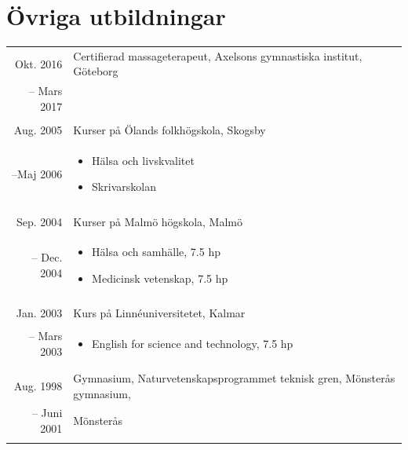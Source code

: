\documentclass[11pt,a4paper]{article}
\begin{document}
\section{Övriga utbildningar}
\begin{tabularx}{\textwidth}{r|X}
	
	Okt. 2016& Certifierad massageterapeut, Axelsons gymnastiska institut, Göteborg\\
	-- Mars 2017& \\
	\multicolumn{2}{c}{} \\
	
	Aug. 2005& Kurser på Ölands folkhögskola, Skogsby \\
	--Maj 2006&\footnotesize{\vspace{-5pt}
		\begin{itemize}[leftmargin=10pt, topsep=-12.5pt]
			\item Hälsa och livskvalitet
			\item Skrivarskolan
		\end{itemize}\vspace{-30pt} 
	}\\
	\multicolumn{2}{c}{} \\
	
	Sep. 2004& Kurser på Malmö högskola, Malmö\\
	-- Dec. 2004&\footnotesize{\vspace{-5pt}
		\begin{itemize}[leftmargin=10pt, topsep=-12.5pt]
			\item Hälsa och samhälle, 7.5 hp
			\item Medicinsk vetenskap, 7.5 hp
		\end{itemize}\vspace{-30pt} 
	}\\
	\multicolumn{2}{c}{} \\	
		
	Jan. 2003& Kurs på Linnéuniversitetet, Kalmar\\
	-- Mars 2003&\footnotesize{\vspace{-5pt}
		\begin{itemize}[leftmargin=10pt, topsep=-12.5pt]
			\item English for science and technology, 7.5 hp
		\end{itemize}\vspace{-30pt} 
	}\\
	
	\multicolumn{2}{c}{} \\
	
	Aug. 1998& Gymnasium, Naturvetenskapsprogrammet teknisk gren, Mönsterås gymnasium,\\
	-- Juni 2001&Mönsterås\\
	\multicolumn{2}{c}{} \\
\end{tabularx}
\end{document}
